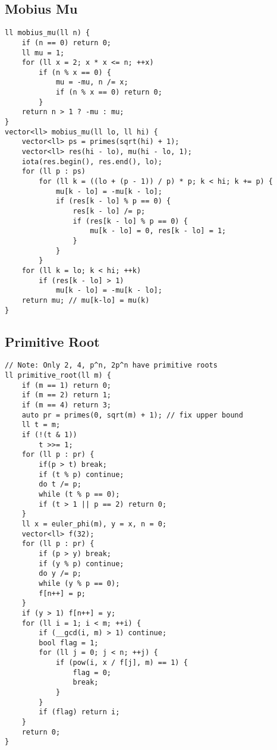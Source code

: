 \documentclass[landscape, 8pt, a4paper, oneside]{extarticle}
\begin{document}
\begin{multicols}{3}
\subsection{Mobius Mu}
\begin{verbatim}
ll mobius_mu(ll n) {
    if (n == 0) return 0;
    ll mu = 1;
    for (ll x = 2; x * x <= n; ++x)
        if (n % x == 0) {
            mu = -mu, n /= x;
            if (n % x == 0) return 0;
        }
    return n > 1 ? -mu : mu;
}
vector<ll> mobius_mu(ll lo, ll hi) {
    vector<ll> ps = primes(sqrt(hi) + 1);
    vector<ll> res(hi - lo), mu(hi - lo, 1);
    iota(res.begin(), res.end(), lo);
    for (ll p : ps)
        for (ll k = ((lo + (p - 1)) / p) * p; k < hi; k += p) {
            mu[k - lo] = -mu[k - lo];
            if (res[k - lo] % p == 0) {
                res[k - lo] /= p;
                if (res[k - lo] % p == 0) {
                    mu[k - lo] = 0, res[k - lo] = 1;
                }
            }
        }
    for (ll k = lo; k < hi; ++k)
        if (res[k - lo] > 1)
            mu[k - lo] = -mu[k - lo];
    return mu; // mu[k-lo] = mu(k)
}
\end{verbatim}
\subsection{Primitive Root}
\begin{verbatim}
// Note: Only 2, 4, p^n, 2p^n have primitive roots
ll primitive_root(ll m) {
    if (m == 1) return 0;
    if (m == 2) return 1;
    if (m == 4) return 3;
    auto pr = primes(0, sqrt(m) + 1); // fix upper bound
    ll t = m;
    if (!(t & 1))
        t >>= 1;
    for (ll p : pr) {
        if(p > t) break;
        if (t % p) continue;
        do t /= p;
        while (t % p == 0);
        if (t > 1 || p == 2) return 0;
    }
    ll x = euler_phi(m), y = x, n = 0;
    vector<ll> f(32);
    for (ll p : pr) {
        if (p > y) break;
        if (y % p) continue;
        do y /= p;
        while (y % p == 0);
        f[n++] = p;
    }
    if (y > 1) f[n++] = y;
    for (ll i = 1; i < m; ++i) {
        if (__gcd(i, m) > 1) continue;
        bool flag = 1;
        for (ll j = 0; j < n; ++j) {
            if (pow(i, x / f[j], m) == 1) {
                flag = 0;
                break;
            }
        }
        if (flag) return i;
    }
    return 0;
}
\end{verbatim}

\end{multicols}
\end{document}
